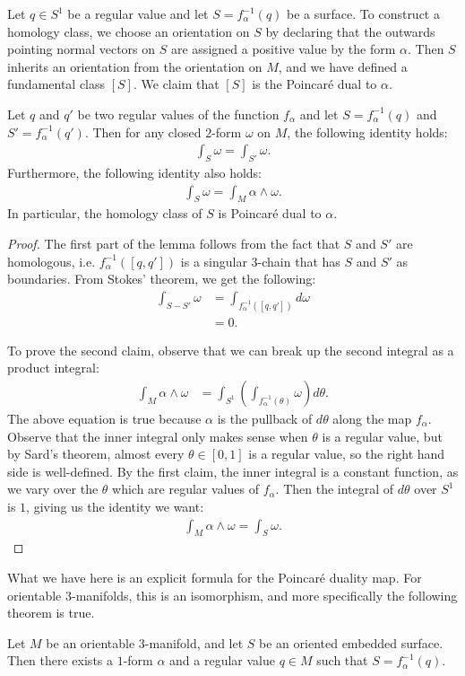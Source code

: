 Let $q\in S^1$ be a regular value and let $S = f_{\alpha}^{-1}(q)$ be a surface. To construct a homology class, we choose an orientation on $S$ by declaring
that the outwards pointing normal vectors on $S$ are assigned a positive value by the form
$\alpha$. Then $S$ inherits an orientation from the orientation on $M$, and we have defined a
fundamental class $[S]$. We claim that $[S]$ is the Poincar\'e dual to $\alpha$.
\begin{lem}
  Let $q$ and $q'$ be two regular values of the function $f_{\alpha}$ and let $S=f_\alpha^{-1}(q)$ and $S'=f_\alpha^{-1}(q')$. Then for any closed $2$-form $\omega$ on $M$,
  the following identity holds:
  \begin{align*}
    \int_{S} \omega = \int_{S'} \omega.
  \end{align*}
  Furthermore, the following identity also holds:
  \begin{align*}
    \int_S \omega = \int_M \alpha \wedge \omega.
  \end{align*}
  In particular, the homology class of $S$ is Poincar\'e dual to $\alpha$.
\end{lem}
\begin{proof}
  The first part of the lemma follows from the fact that $S$ and $S'$ are homologous,
  i.e. $f^{-1}_{\alpha}([q, q'])$ is a singular $3$-chain that has $S$ and $S'$ as boundaries. From Stokes'
  theorem, we get the following:
  \begin{align*}
    \int_{S - S'} \omega &= \int_{f_{\alpha}^{-1}([q, q'])} d\omega \\
                         &= 0.
  \end{align*}

  To prove the second claim, observe that we can break up the second integral as a product integral:
  \begin{align*}
    \int_M \alpha \wedge \omega &= \int_{S^1} \left(   \int_{f_{\alpha}^{-1}(\theta)} \omega \right) d\theta.
  \end{align*}
  The above equation is true because $\alpha$ is the pullback of $d\theta$ along the map $f_{\alpha}$. Observe
  that the inner integral only makes sense when $\theta$ is a regular value, but by Sard's theorem, almost
  every $\theta \in [0,1]$ is a regular value, so the right hand side is well-defined. By the first claim, the inner integral is a constant function, as we vary over the $\theta$ which are regular values of $f_{\alpha}$.
  Then the integral of $d\theta$ over $S^1$ is $1$, giving us the identity we want:
  \begin{align*}
    \int_M \alpha \wedge \omega = \int_S \omega.
  \end{align*}
\end{proof}
What we have here is an explicit formula for the Poincar\'e duality map. For orientable $3$-manifolds, this
is an isomorphism, and more specifically the following theorem is true.
\begin{thm}
  Let $M$ be an orientable $3$-manifold, and let $S$ be an oriented embedded surface. Then there exists a $1$-form
  $\alpha$ and a regular value $q\in M$ such that $S = f_{\alpha}^{-1}(q)$.
\end{thm}

